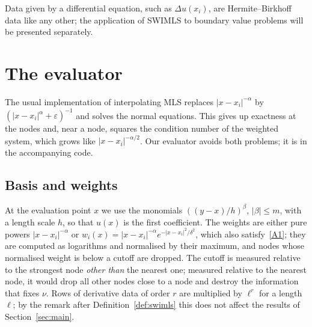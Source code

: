 \documentclass[12pt]{amsart}
\theoremstyle{definition}
\theoremstyle{remark}
\begin{document}
Data given by a differential equation, such as $\Delta u(x_i)$, are Hermite--Birkhoff data like
any other; the application of SWIMLS to boundary value problems will be presented separately.

\appendix

\section{The evaluator}\label{sec:evaluation}
The usual implementation of interpolating MLS replaces $|x-x_i|^{-\alpha}$ by
$(|x-x_i|^\alpha+\varepsilon)^{-1}$ and solves the normal equations. This gives up exactness at
the nodes and, near a node, squares the condition number of the weighted system, which grows
like $|x-x_i|^{-\alpha/2}$.
Our evaluator avoids both problems; it is in the accompanying code.

\subsection{Basis and weights}
 At the evaluation point $x$ we use the monomials
$((y-x)/h)^\beta$, $|\beta|\le m$, with a length scale $h$, so that $u(x)$ is the first
coefficient. The weights are either pure powers $|x-x_i|^{-\alpha}$ or
$w_i(x)=|x-x_i|^{-\alpha}e^{-|x-x_i|^2/\delta^2}$, which also satisfy~\ref{A1}; they are computed as logarithms and normalised by their maximum, and
nodes whose normalised weight is below a cutoff are dropped. The cutoff is measured relative to
the strongest node \emph{other than} the nearest one; measured relative to the nearest node,
it would drop all other nodes close to a node and destroy the information that fixes $\nu$.
Rows of derivative data of order $r$ are multiplied by $\ell^{r}$ for a length $\ell$; by the
remark after Definition~\ref{def:swimls} this does not affect the results of
Section~\ref{sec:main}.
\end{document}
